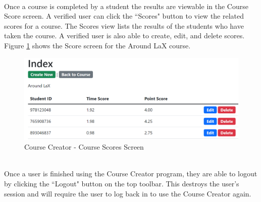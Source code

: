 \\
Once a course is completed by a student the results are viewable in the Course Score screen. A verified user can click the ``Scores" button to view the related scores for a course. The Scores view lists the results of the students who have taken the course. A verified user is also able to create, edit, and delete scores. Figure \ref{CC Scores} shows the Score screen for the Around LaX course. \\
\begin{figure}[htb]
	\centering
	\includegraphics[width=.6\textwidth]{Requirements/assets/cc-score-viewer.png}
	\caption[Course Creator - Course Scores Screen]{\label{CC Scores}Course Creator - Course Scores Screen}
\end{figure}
\\
Once a user is finished using the Course Creator program, they are able to logout by clicking the ``Logout" button on the top toolbar. This destroys the user's session and will require the user to log back in to use the Course Creator again. \\
